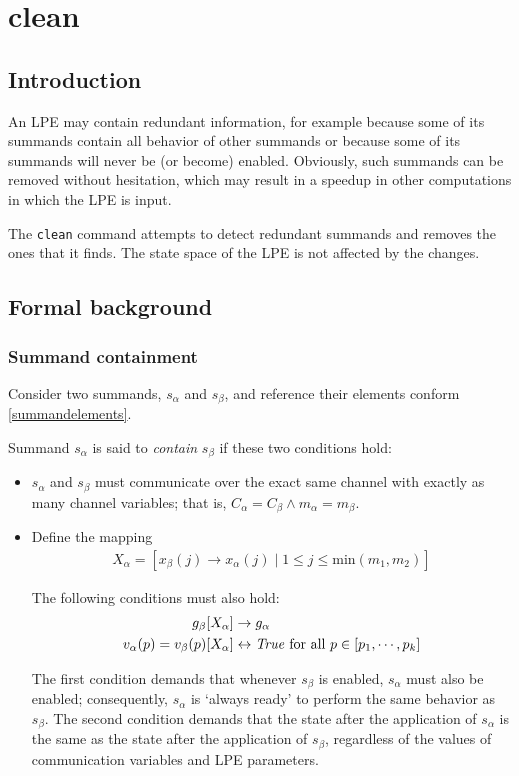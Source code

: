 \chapter{clean} \label{clean}

\section{Introduction}

An LPE may contain redundant information, for example because some of its summands contain all behavior of other summands or because some of its summands will never be (or become) enabled.
Obviously, such summands can be removed without hesitation, which may result in a speedup in other computations in which the LPE is input.

The \texttt{clean} command attempts to detect redundant summands and removes the ones that it finds.
The state space of the LPE is not affected by the changes.

\section{Formal background}

\subsection{Summand containment}

Consider two summands, $s_\alpha$ and $s_\beta$, and reference their elements conform \ref{summandelements}.

Summand $s_\alpha$ is said to \emph{contain} $s_\beta$ if these two conditions hold:

\begin{itemize}
\item $s_\alpha$ and $s_\beta$ must communicate over the exact same channel with exactly as many channel variables; that is, $C_\alpha = C_\beta \land m_\alpha = m_\beta$.

\item Define the mapping
\begin{align*}
X_\alpha = [x_\beta(j) \rightarrow x_\alpha(j) \;|\; 1 \leq j \leq \text{min}(m_1, m_2)]
\end{align*}

The following conditions must also hold:
\begin{align*}
g_\beta[X_\alpha] &\rightarrow g_\alpha \\
v_\alpha(p) = v_\beta(p)[X_\alpha] &\leftrightarrow \text{\textit{True}} \text{ for all } p \in [p_1, \cdots{}, p_k]
\end{align*}

The first condition demands that whenever $s_\beta$ is enabled, $s_\alpha$ must also be enabled; consequently, $s_\alpha$ is `always ready' to perform the same behavior as $s_\beta$.
The second condition demands that the state after the application of $s_\alpha$ is the same as the state after the application of $s_\beta$, regardless of the values of communication variables and LPE parameters.
\end{itemize}

